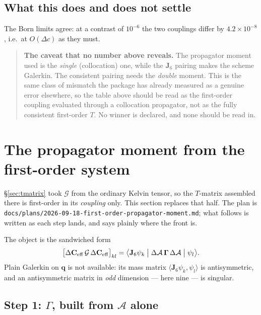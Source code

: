 \documentclass[11pt,a4paper]{article}
\newcommand{\bq}{\mathbf{q}}
\newcommand{\Aop}{\mathcal{A}}
\newcommand{\dA}{\Delta\mathcal{A}}
\newcommand{\dCeff}{\Delta\mathbf{C}_{\mathrm{eff}}}
\newcommand{\Jsix}{\mathbf{J}_{6}}
\begin{document}
\subsection{What this does and does not settle}

The Born limits agree: at a contrast of $10^{-6}$ the two couplings differ by
$4.2\times10^{-8}$, i.e.\ at $O(\Delta c)$ as they must.

\begin{quote}
\textbf{The caveat that no number above reveals.}  The propagator moment used is
the \emph{single} (collocation) one, while the $\Jsix$ pairing makes the scheme
Galerkin.  The consistent pairing needs the \emph{double} moment.  This is the
same class of mismatch the package has already measured as a genuine error
elsewhere, so the table above should be read as the first-order coupling
evaluated through a collocation propagator, not as the fully consistent
first-order $T$.  No winner is declared, and none should be read in.
\end{quote}

\section{The propagator moment from the first-order system}\label{sec:propmom}

\S\ref{sec:tmatrix} took $\mathcal{G}$ from the ordinary Kelvin tensor, so the
$T$-matrix assembled there is first-order in its \emph{coupling} only.  This
section replaces that half.  The plan is
\texttt{docs/plans/2026-09-18-first-order-propagator-moment.md}; what follows is
written as each step lands, and says plainly where the front is.

The object is the sandwiched form
\begin{equation}\label{eq:sandwich}
  \bigl[\dCeff\,\mathcal{G}\,\dCeff\bigr]_{kl}
  = \bigl\langle \Jsix\psi_k \bigm| \dA\,\boldsymbol\Gamma\,\dA \bigm| \psi_l \bigr\rangle .
\end{equation}
Plain Galerkin on $\bq$ is not available: its mass matrix
$\langle\Jsix\psi_k,\psi_l\rangle$ is antisymmetric, and an antisymmetric matrix
in \emph{odd} dimension --- here nine --- is singular.

\subsection{Step 1: \texorpdfstring{$\Gamma$}{Gamma}, built from
\texorpdfstring{$\Aop$}{A} alone}
\end{document}
